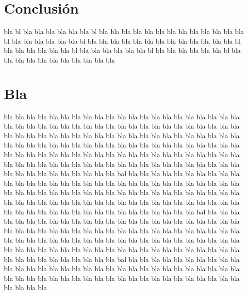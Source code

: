 \documentclass[fisica]{fcfmtesis}
\begin{document}
\newpage
{}
\chapter*{Conclusión}

 bla bl bla bla bla bla bla bla bl bla bla bla bla bla bla bla bla bla
 bla bla bla bla bl bla bla bla bla bla bla bl bla bla bla bla bla bla
 bla bla bla bla bla bla bla bl bla bla bla bla bla bla bl bla bla bla
 bla bla bla bl bla bla bla bla bla bla bl bla bla bla bla bla bla bla
 bla bla bla bla

\appendix
\chapter{Bla}

  bla bla bla bla bla bla bla bla bla bla bla bla bla bla bla bla bla bla
  bla bla bla bla bla bla bla bla bla bla bla bla bla bla bla bla bla bla
  bla bla bla bla bla bla bla bla bla bla bla bla bla bla bla bla bla bla
  bla bla bla bla bla bla bla bla bla bla bla bla bla bla bla bla bla bla
  bla bla bla bla bla bla bla bla bla bla bla bla bla bla bla bla bla bla
  bla bla bla bla bla bla bla bla bla bla bla bla bla bla bla bla bla bla
  bla bla bla bla bla bla bla bla bla bla bla bla bla bla bla bla bla bla
  bla bla bla bla bla bla bla bla bla bla bal bla bla bla bla bla bla bla
  bla bla bla bla bla bla bla bla bla bla bla bla bla bla bla bla bla bla
  bla bla bla bla bla bla bla bla bla bla bla bla bla bla bla bla bla bla
  bla bla bla bla bla bla bla bla bla bla bla bla bla bla bla bla bla bla
  bla bla bla bla bla bla bla bla bla bla bla bla bla bla bla bla bla bla
  bla bla bla bla bla bla bla bla bla bla bla bal bla bla bla bla bla bla
  bla bla bla bla bla bla bla bla bla bla bla bla bla bla bla bla bla bla
  bla bla bla bla bla bla bla bla bla bla bla bla bla bla bla bla bla bla
  bla bla bla bla bla bla bla bla bla bla bla bla bla bla bla bla bla bla
  bla bla bla bla bla bla bla bla bla bla bla bla bla bla bla bla bla bla
  bla bla bla bla bla bla bla bla bla bla bla bla bla bla bla bla bla bla
  bla bal bla bla bla bla bla bla bla bla bla bla bla bla bla bla bla bla
  bla bla bla bla bla bla bla bla bla bla bla bla bla bla bla bla bla bla
  bla bla bla bla bla bla bla bla bla bla bla bla bla bla bla bla bla bla
  bla bla bla bla
\end{document}
